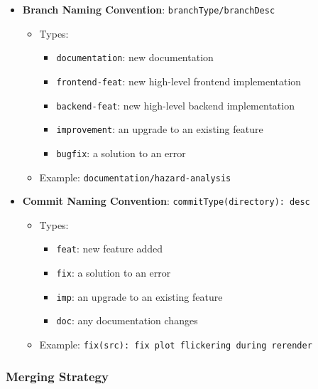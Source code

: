 \documentclass{article}
\begin{document}
\begin{itemize}
    \item \textbf{Branch Naming Convention}: \texttt{branchType/branchDesc}
        \begin{itemize}
            \item Types:
                \begin{itemize}
                    \item \texttt{documentation}: new documentation
                    \item \texttt{frontend-feat}: new high-level frontend
                    implementation
                    \item \texttt{backend-feat}: new high-level backend
                    implementation
                    \item \texttt{improvement}: an upgrade to an existing
                    feature
                    \item \texttt{bugfix}: a solution to an error
                \end{itemize}
            \item Example: \texttt{documentation/hazard-analysis}
        \end{itemize}
    \item \textbf{Commit Naming Convention}: \texttt{commitType(directory):
    desc}
        \begin{itemize}
            \item Types:
                \begin{itemize}
                    \item \texttt{feat}: new feature added
                    \item \texttt{fix}: a solution to an error
                    \item \texttt{imp}: an upgrade to an existing feature
                    \item \texttt{doc}: any documentation changes
                \end{itemize}
            \item Example: \texttt{fix(src): fix plot flickering during
            rerender}
        \end{itemize}
\end{itemize}

\subsubsection{Merging Strategy}
\end{document}
